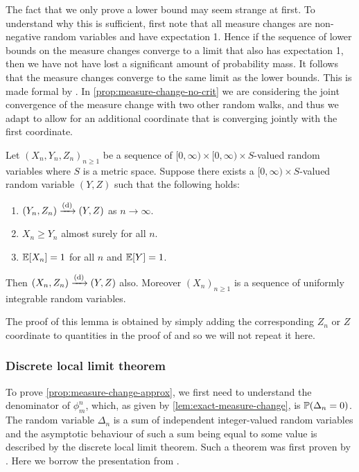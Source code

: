 The fact that we only prove a lower bound may seem strange at first. To understand why this is sufficient, first note that all measure changes are non-negative random variables and have expectation 1. Hence if the sequence of lower bounds on the measure changes converge to a limit that also has expectation 1, then we have not have lost a significant amount of probability mass. It follows that the measure changes converge to the same limit as the lower bounds. This is made formal by \citet[Lemma 4.8]{conchon--kerjanStableGraphMetric2021}. In \cref{prop:measure-change-no-crit} we are considering the joint convergence of the measure change with two other random walks, and thus we adapt \cite[Lemma 4.8]{conchon--kerjanStableGraphMetric2021} to allow for an additional coordinate that is converging jointly with the first coordinate.
\begin{lemma}
    \label{lem:sandwiching-lemma}
    Let $(X_n, Y_n, Z_n)_{n \geq 1}$ be a sequence of $[0, \infty) \times [0, \infty) \times S$-valued random variables where $S$ is a metric space. Suppose there exists a $[0, \infty) \times S$-valued random variable $(Y, Z)$ such that the following holds:
    \begin{enumerate}
        \item $(Y_n, Z_n) \todist (Y, Z)$ as $n \to \infty$.
        \item $X_n \geq Y_n$ almost surely for all $n$.
        \item $\E[X_n] = 1$ for all $n$ and $\E[Y] = 1$.
    \end{enumerate}
    Then $(X_n, Z_n) \todist (Y, Z)$ also. Moreover $(X_n)_{n \geq 1}$ is a sequence of uniformly integrable random variables.
\end{lemma}
The proof of this lemma is obtained by simply adding the corresponding $Z_n$ or $Z$ coordinate to quantities in the proof of \cite[Lemma 4.8]{conchon--kerjanStableGraphMetric2021} and so we will not repeat it here.

\subsubsection{Discrete local limit theorem}

To prove \cref{prop:measure-change-approx}, we first need to understand the denominator of $\phi^n_m$, which, as given by \cref{lem:exact-measure-change}, is $\P(\Delta_n = 0)$. The random variable $\Delta_n$ is a sum of independent integer-valued random variables and the asymptotic behaviour of such a sum being equal to some value is described by the discrete local limit theorem. Such a theorem was first proven by \citet{gnedenkoLocalLimitTheorem1948}. Here we borrow the presentation from \citet[Section 3.5]{durrettProbabilityTheoryExamples2019}.

